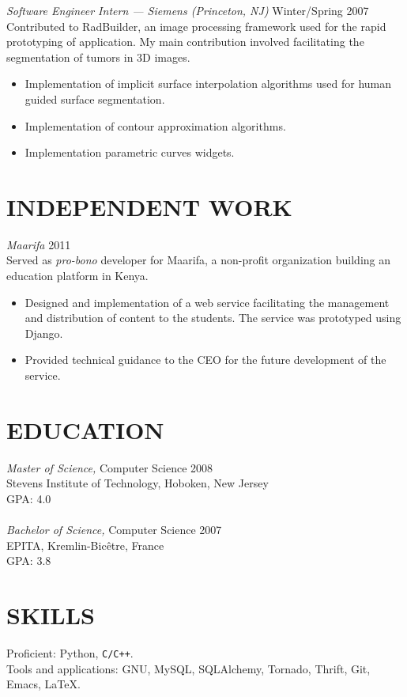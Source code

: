 \documentclass[line,margin]{res}
\begin{document}
\begin{resume}
                {\sl Software Engineer Intern --- Siemens (Princeton, NJ)} \hfill Winter/Spring 2007 \\
                Contributed to RadBuilder, an image processing framework used for the rapid prototyping of application. My main contribution involved facilitating the segmentation of tumors in 3D images.
                \begin{itemize}  \itemsep -2pt
                    \item Implementation of implicit surface interpolation algorithms used for human guided surface segmentation.
                    \item Implementation of contour approximation algorithms.
                    \item Implementation parametric curves widgets.
                \end{itemize}

\section{INDEPENDENT WORK}
                {\sl Maarifa} \hfill 2011 \\
                Served as \textit{pro-bono} developer for Maarifa, a non-profit organization building an education platform in Kenya.
                \begin{itemize}  \itemsep -2pt
                    \item Designed and implementation of a web service facilitating the management and distribution of content to the students. The service was prototyped using Django.
                    \item Provided technical guidance to the CEO for the future development of the service.
                \end{itemize}

\section{EDUCATION} 
                {\sl Master of Science,} Computer Science \hfill 2008 \\
                Stevens Institute of Technology, Hoboken, New Jersey \\
                GPA: 4.0 \\
                \vspace{1pt} \\
                {\sl Bachelor of Science,} Computer Science \hfill 2007 \\
                EPITA, Kremlin-Bic\^etre, France \\
                GPA: 3.8

\section{SKILLS}
                Proficient: Python, \texttt{C/C++}. \\
                Tools and applications: GNU, MySQL, SQLAlchemy, Tornado, Thrift,
                 Git, Emacs, \LaTeX. \\

\end{resume}
\end{document}
